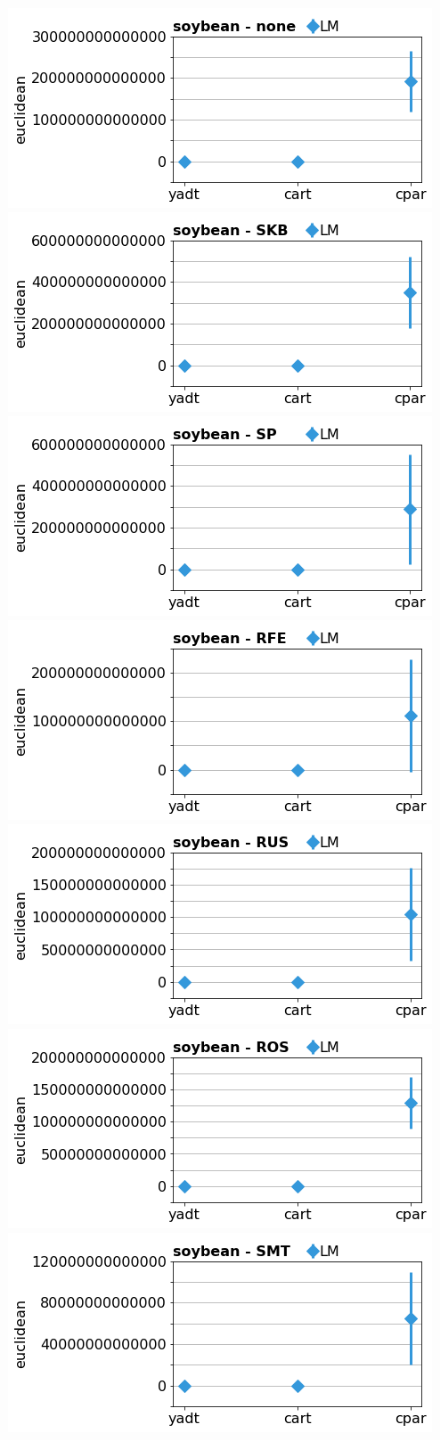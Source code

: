 \documentclass[runningheads,a4paper]{llncs}
\begin{document}
\begin{figure}[!h]
\includegraphics[width=0.32\linewidth]{fig/models_soybean_none_euclidean.png}\\
\includegraphics[width=0.32\linewidth]{fig/models_soybean_SKB_euclidean.png}
\includegraphics[width=0.32\linewidth]{fig/models_soybean_SP_euclidean.png}
\includegraphics[width=0.32\linewidth]{fig/models_soybean_RFE_euclidean.png}
\includegraphics[width=0.32\linewidth]{fig/models_soybean_RUS_euclidean.png}
\includegraphics[width=0.32\linewidth]{fig/models_soybean_ROS_euclidean.png}
\includegraphics[width=0.32\linewidth]{fig/models_soybean_SMT_euclidean.png}
\end{figure}
\end{document}
